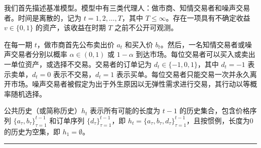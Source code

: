 \documentclass[12pt,a4paper]{article}
\newenvironment{translation}{%
  \par\vspace{2pt}\noindent%
  \color{transblue}%
  \ignorespaces
}{%
  \par\vspace{4pt}\hrule\vspace{6pt}%
}
\begin{document}
\begin{translation}
我们首先描述基准模型。模型中有三类代理人：做市商、知情交易者和噪声交易者。时间是离散的，记为 $t = 1, 2, \ldots, T$，其中 $T \leq \infty$。存在一项具有不确定收益 $v \in \{0, 1\}$ 的资产，该收益在时期 $T$ 之前不公开可观测。

在每一期 $t$，做市商首先公布卖出价 $a_t$ 和买入价 $b_t$。然后，一名知情交易者或噪声交易者分别以概率 $\alpha \in (0, 1)$ 或 $1 - \alpha$ 到达市场。每位交易者可以买入或卖出一单位资产，或选择不交易。交易者的订单记为 $d_t \in \{-1, 0, 1\}$，其中 $d_t = -1$ 表示卖单，$d_t = 0$ 表示不交易，$d_t = 1$ 表示买单。每位交易者只能交易一次并永久离开市场。噪声交易者被假定为出于外生原因以无弹性需求进行交易，其行动以等概率随机选择。

公共历史（或简称历史）$h_t$ 表示所有可能的长度为 $t-1$ 的历史集合，包含价格序列 $\{a_\tau, b_\tau\}_{\tau=1}^{t-1}$ 和订单序列 $\{d_\tau\}_{\tau=1}^{t-1}$，即 $h_t = \{a_\tau, b_\tau, d_\tau\}_{\tau=1}^{t-1}$，且按惯例，长度为0的历史为空集，即 $h_1 = \emptyset$。
\end{translation}
\end{document}
